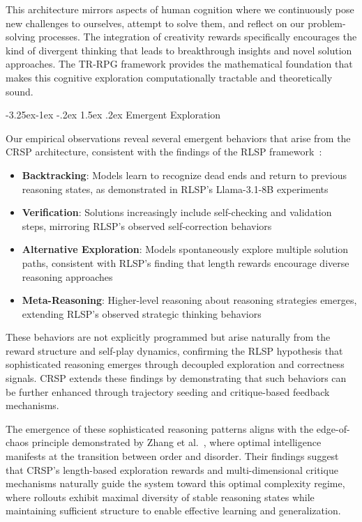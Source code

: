 \documentclass[10pt,a4paper]{article}
\makeatletter
\renewcommand\subsection{\@startsection{subsection}{2}{\z@}%
  {-3.25ex\@plus -1ex \@minus -.2ex}%
  {1.5ex \@plus .2ex}%
  {\fontfamily{sourcecodepro}\selectfont\large\bfseries}}
\makeatother
\begin{document}
This architecture mirrors aspects of human cognition where we continuously pose new challenges to ourselves, attempt to solve them, and reflect on our problem-solving processes. The integration of creativity rewards specifically encourages the kind of divergent thinking that leads to breakthrough insights and novel solution approaches. The TR-RPG framework provides the mathematical foundation that makes this cognitive exploration computationally tractable and theoretically sound.

\subsection{Emergent Exploration}

Our empirical observations reveal several emergent behaviors that arise from the CRSP architecture, consistent with the findings of the RLSP framework~\cite{ye2025emergence}:

\begin{itemize}
\item \textbf{Backtracking}: Models learn to recognize dead ends and return to previous reasoning states, as demonstrated in RLSP's Llama-3.1-8B experiments
\item \textbf{Verification}: Solutions increasingly include self-checking and validation steps, mirroring RLSP's observed self-correction behaviors
\item \textbf{Alternative Exploration}: Models spontaneously explore multiple solution paths, consistent with RLSP's finding that length rewards encourage diverse reasoning approaches
\item \textbf{Meta-Reasoning}: Higher-level reasoning about reasoning strategies emerges, extending RLSP's observed strategic thinking behaviors
\end{itemize}

These behaviors are not explicitly programmed but arise naturally from the reward structure and self-play dynamics, confirming the RLSP hypothesis that sophisticated reasoning emerges through decoupled exploration and correctness signals. CRSP extends these findings by demonstrating that such behaviors can be further enhanced through trajectory seeding and critique-based feedback mechanisms.

The emergence of these sophisticated reasoning patterns aligns with the edge-of-chaos principle demonstrated by Zhang et al.~\cite{zhang2024intelligence}, where optimal intelligence manifests at the transition between order and disorder. Their findings suggest that CRSP's length-based exploration rewards and multi-dimensional critique mechanisms naturally guide the system toward this optimal complexity regime, where rollouts exhibit maximal diversity of stable reasoning states while maintaining sufficient structure to enable effective learning and generalization.
\end{document}
